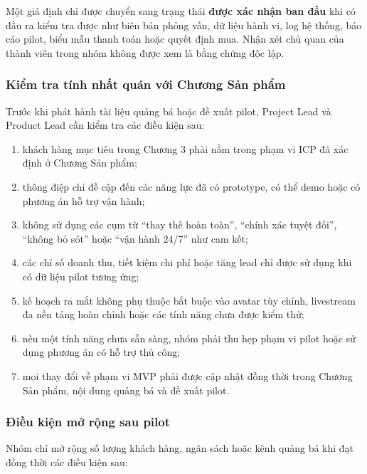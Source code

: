 Một giả định chỉ được chuyển sang trạng thái \textbf{được xác nhận ban đầu} khi có đầu ra kiểm tra được như biên bản phỏng vấn, dữ liệu hành vi, log hệ thống, báo cáo pilot, biểu mẫu thanh toán hoặc quyết định mua. Nhận xét chủ quan của thành viên trong nhóm không được xem là bằng chứng độc lập.

\subsubsection{Kiểm tra tính nhất quán với Chương Sản phẩm}

Trước khi phát hành tài liệu quảng bá hoặc đề xuất pilot, Project Lead và Product Lead cần kiểm tra các điều kiện sau:

\begin{enumerate}
    \item khách hàng mục tiêu trong Chương 3 phải nằm trong phạm vi ICP đã xác định ở Chương Sản phẩm;
    \item thông điệp chỉ đề cập đến các năng lực đã có prototype, có thể demo hoặc có phương án hỗ trợ vận hành;
    \item không sử dụng các cụm từ ``thay thế hoàn toàn'', ``chính xác tuyệt đối'', ``không bỏ sót'' hoặc ``vận hành 24/7'' như cam kết;
    \item các chỉ số doanh thu, tiết kiệm chi phí hoặc tăng lead chỉ được sử dụng khi có dữ liệu pilot tương ứng;
    \item kế hoạch ra mắt không phụ thuộc bắt buộc vào avatar tùy chỉnh, livestream đa nền tảng hoàn chỉnh hoặc các tính năng chưa được kiểm thử;
    \item nếu một tính năng chưa sẵn sàng, nhóm phải thu hẹp phạm vi pilot hoặc sử dụng phương án có hỗ trợ thủ công;
    \item mọi thay đổi về phạm vi MVP phải được cập nhật đồng thời trong Chương Sản phẩm, nội dung quảng bá và đề xuất pilot.
\end{enumerate}

\subsubsection{Điều kiện mở rộng sau pilot}

Nhóm chỉ mở rộng số lượng khách hàng, ngân sách hoặc kênh quảng bá khi đạt đồng thời các điều kiện sau:

